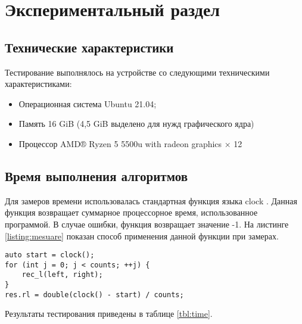 \chapter{Экспериментальный раздел}
\label{cha:research}

\section{Технические характеристики}
Тестирование выполнялось на устройстве со следующими техническими характеристиками:
\begin{itemize}
	\item Операционная система Ubuntu 21.04;
	\item Память 16 GiB (4,5 GiB выделено для нужд графического ядра)
	\item Процессор AMD® Ryzen 5 5500u with radeon graphics × 12 
\end{itemize}

\section{Время выполнения алгоритмов}

Для замеров времени использовалась стандартная функция языка clock \cite{clock}.  Данная функция возвращает суммарное процессорное время, использованное программой. В случае ошибки, функция возвращает значение -1. На листинге \ref{listing:mesuare} показан способ применения данной функции при замерах.

\begin{lstlisting}[caption={Замер времени функции}, label=listing:mesuare]
auto start = clock();
for (int j = 0; j < counts; ++j) {
    rec_l(left, right);
}
res.rl = double(clock() - start) / counts;
\end{lstlisting}


Результаты тестирования приведены в таблице \ref{tbl:time}.

